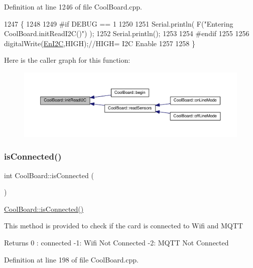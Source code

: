 Definition at line 1246 of file Cool\+Board.\+cpp.


\begin{DoxyCode}
1247 \{
1248 
1249 \textcolor{preprocessor}{#if DEBUG == 1}
1250 
1251     Serial.println( F(\textcolor{stringliteral}{"Entering CoolBoard.initReadI2C()"}) );
1252     Serial.println();
1253 
1254 \textcolor{preprocessor}{#endif}
1255  
1256     digitalWrite(\hyperlink{class_cool_board_af1fe1376fc66f93dee80b327ca695377}{EnI2C},HIGH);\textcolor{comment}{//HIGH= I2C Enable}
1257 
1258 \}
\end{DoxyCode}
Here is the caller graph for this function\+:\nopagebreak
\begin{figure}[H]
\begin{center}
\leavevmode
\includegraphics[width=350pt]{d7/df9/class_cool_board_a397b46fadab8f530a8cf4d914c561366_icgraph}
\end{center}
\end{figure}
\mbox{\label{class_cool_board_ad7442cf4b62c7b0d5bd62a0f75ffc065}} 
\subsubsection{\texorpdfstring{is\+Connected()}{isConnected()}}
{\footnotesize\ttfamily int Cool\+Board\+::is\+Connected (\begin{DoxyParamCaption}{ }\end{DoxyParamCaption})}

\hyperlink{class_cool_board_ad7442cf4b62c7b0d5bd62a0f75ffc065}{Cool\+Board\+::is\+Connected()}

This method is provided to check if the card is connected to Wifi and M\+Q\+TT

\begin{DoxyReturn}{Returns}
0 \+: connected -\/1\+: Wifi Not Connected -\/2\+: M\+Q\+TT Not Connected 
\end{DoxyReturn}


Definition at line 198 of file Cool\+Board.\+cpp.


